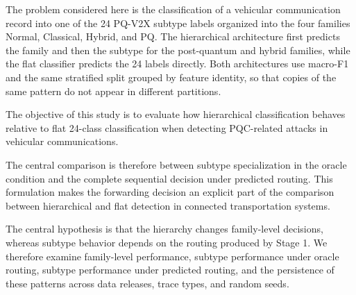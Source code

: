 \documentclass{IEEEoj}
\begin{document}
The problem considered here is the classification of a vehicular communication
record into one of the 24 PQ-V2X subtype labels organized into the four
families Normal, Classical, Hybrid, and PQ. The hierarchical architecture first
predicts the family and then the subtype for the post-quantum and hybrid
families, while the flat classifier predicts the 24 labels directly. Both
architectures use macro-F1 and the same stratified split grouped by feature
identity, so that copies of the same pattern do not appear in different
partitions.

The objective of this study is to evaluate how hierarchical classification
behaves relative to flat 24-class classification when detecting PQC-related
attacks in vehicular communications.


The central comparison is therefore between subtype specialization in the
oracle condition and the complete sequential decision under predicted routing.
This formulation makes the forwarding decision an explicit part of the
comparison between hierarchical and flat detection in connected transportation
systems.

The central hypothesis is that the hierarchy changes family-level decisions,
whereas subtype behavior depends on the routing produced by Stage 1. We
therefore examine family-level performance, subtype performance under oracle
routing, subtype performance under predicted routing, and the persistence of
these patterns across data releases, trace types, and random seeds.
\end{document}
